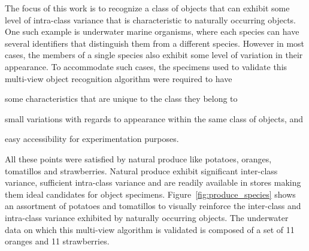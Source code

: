 \documentclass {udthesis}
\begin{document}
The focus of this work is to recognize a class of objects that can exhibit some level of intra-class variance that is characteristic to naturally occurring objects. One such example is underwater marine organisms, where each species can have several identifiers that distinguish them from a different species. However in most cases, the members of a single species also exhibit some level of variation in their appearance. To accommodate such cases, the specimens used to validate this multi-view object recognition algorithm were required to have \begin{enumerate*}[label=(\roman*)]  \item some characteristics that are unique to the class they belong to \item small variations with regards to appearance within the same class of objects, and \item easy accessibility for experimentation purposes. \end{enumerate*} All these points were satisfied by natural produce like potatoes, oranges, tomatillos and strawberries. Natural produce exhibit significant inter-class variance, sufficient intra-class variance and are 
readily 
available in stores making them ideal 
candidates for object specimens. Figure~\ref{fig:produce_species} shows an assortment of potatoes and tomatillos to visually reinforce the inter-class and intra-class variance exhibited by naturally occurring objects. The underwater data on which this multi-view algorithm is validated is composed of a set of 11 oranges and 11 strawberries.
%
\end{document}
